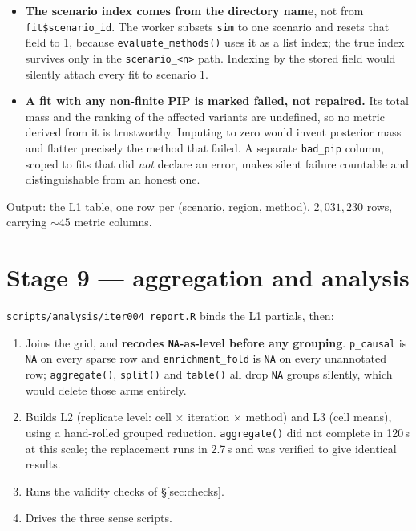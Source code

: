 \documentclass[11pt,a4paper]{article}
\newcommand{\file}[1]{\texttt{\small #1}}
\begin{document}
\begin{itemize}
\item \textbf{The scenario index comes from the directory name}, not from
\texttt{fit\$scenario\_id}. The worker subsets \file{sim} to one scenario and
resets that field to 1, because \texttt{evaluate\_methods()} uses it as a list
index; the true index survives only in the \file{scenario\_<n>} path. Indexing
by the stored field would silently attach every fit to scenario 1.
\item \textbf{A fit with any non-finite PIP is marked failed, not repaired.} Its
total mass and the ranking of the affected variants are undefined, so no metric
derived from it is trustworthy. Imputing to zero would invent posterior mass and
flatter precisely the method that failed. A separate \texttt{bad\_pip} column,
scoped to fits that did \emph{not} declare an error, makes silent failure
countable and distinguishable from an honest one.
\end{itemize}

Output: the L1 table, one row per (scenario, region, method), $2{,}031{,}230$
rows, carrying $\sim45$ metric columns.

\section{Stage 9 --- aggregation and analysis}

\file{scripts/analysis/iter004\_report.R} binds the L1 partials, then:

\begin{enumerate}
\item Joins the grid, and \textbf{recodes \texttt{NA}-as-level before any
grouping}. \texttt{p\_causal} is \texttt{NA} on every sparse row and
\texttt{enrichment\_fold} is \texttt{NA} on every unannotated row;
\texttt{aggregate()}, \texttt{split()} and \texttt{table()} all drop \texttt{NA}
groups silently, which would delete those arms entirely.
\item Builds L2 (replicate level: cell $\times$ iteration $\times$ method) and
L3 (cell means), using a hand-rolled grouped reduction. \texttt{aggregate()} did
not complete in 120\,s at this scale; the replacement runs in 2.7\,s and was
verified to give identical results.
\item Runs the validity checks of \S\ref{sec:checks}.
\item Drives the three sense scripts.
\end{enumerate}
\end{document}
